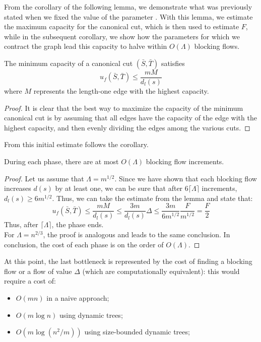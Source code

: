     From the corollary of the following lemma, we demonstrate what was previously stated when we fixed the value of the parameter \dlt.  
    With this lemma, we estimate the maximum capacity for the canonical cut, which is then used to estimate \( F \), while in the subsequent corollary, we show how the parameters for which we contract the graph lead this capacity to halve within \( O(\Lambda) \) blocking flows.

    \begin{lemma}
        The minimum capacity of a canonical cut $(\bar{S}, \bar{T})$ satisfies
        \[u_f(\bar{S}, \bar{T})\le \frac{mM}{d_l(s)}\]
        where $M$ represents the length-one edge with the highest capacity.
    \end{lemma}
    \begin{proof}
        It is clear that the best way to maximize the capacity of the minimum canonical cut is by assuming that all edges have the capacity of the edge with the highest capacity, and then evenly dividing the edges among the various cuts.

    \end{proof}

    From this initial estimate follows the corollary.
    \begin{corollary}
    During each phase, there are at most $O(\Lambda)$ blocking flow increments.
    \end{corollary}
    \begin{proof}
        Let us assume that \( \Lambda = m^{1/2} \). Since we have shown that each blocking flow increases \( d(s) \) by at least one, we can be sure that after \( 6\lceil \Lambda \rceil \) increments, \( d_l(s) \geq 6 m^{1/2} \).  
        Thus, we can take the estimate from the lemma and state that:  
        \[
        u_f(\bar{S}, \bar{T}) \le \frac{mM}{d_l(s)} \le \frac{3m}{d_l(s)}\Delta \le \frac{3m}{6m^{1/2}} \frac{F}{m^{1/2}} = \frac{F}{2}
        \]
        Thus, after \( \lceil \Lambda \rceil \), the phase ends.\\  
        For \( \Lambda = n^{2/3} \), the proof is analogous and leads to the same conclusion.  
        In conclusion, the cost of each phase is on the order of \( O(\Lambda) \).
    \end{proof}
    \newpage

    At this point, the last bottleneck is represented by the cost of finding a blocking flow or a flow of value \( \Delta \) (which are computationally equivalent):  
    this would require a cost of:
    \begin{itemize}
        \item \( O(mn) \) in a naive approach;
        \item \( O(m \log n) \) using dynamic trees;
        \item \( O(m \log(n^2/m)) \) using size-bounded dynamic trees;
    \end{itemize}
    
